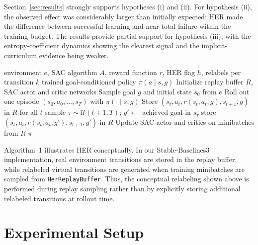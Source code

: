 \documentclass{article}
\begin{document}
Section~\ref{sec:results} strongly supports hypotheses (i) and (ii). For
hypothesis (ii), the observed effect was considerably larger than initially
expected: HER made the difference between successful learning and near-total
failure within the training budget. The results provide partial support for
hypothesis (iii), with the entropy-coefficient dynamics showing the clearest
signal and the implicit-curriculum evidence being weaker.

\begin{algorithm}[H]
    \caption{SAC with optional Hindsight Experience Replay}
    \label{alg:code}
    \begin{algorithmic}
        \Require environment $e$, SAC algorithm $A$, reward function $r$,
                 HER flag $h$, relabels per transition $k$
        \Ensure trained goal-conditioned policy $\pi(a \mid s, g)$
        \State Initialize replay buffer $R$, SAC actor and critic networks
            \State Sample goal $g$ and initial state $s_0$ from $e$
            \State Roll out one episode $(s_0, a_0, \dots, s_T)$ with $\pi(\cdot \mid s, g)$
            \State Store $(s_t, a_t, r(s_t, a_t, g), s_{t+1}, g)$ in $R$ for all $t$
                    \State sample $\tau \sim \mathcal{U}(t+1, T)$;\;
                           $g' \gets$ achieved goal in $s_\tau$
                    \State store $(s_t, a_t, r(s_t, a_t, g'), s_{t+1}, g')$ in $R$
                \EndFor
            \EndIf
            \State Update SAC actor and critics on minibatches from $R$
        \EndWhile
        \State \Return $\pi$
    \end{algorithmic}
\end{algorithm}

Algorithm~1 illustrates HER conceptually. In our
Stable-Baselines3 implementation, real environment transitions are stored in
the replay buffer, while relabeled virtual transitions are generated when
training minibatches are sampled from \texttt{HerReplayBuffer}. Thus, the
conceptual relabeling shown above is performed during replay sampling rather
than by explicitly storing additional relabeled transitions at rollout time.

\section{Experimental Setup}
\label{sec:setup}
\end{document}
